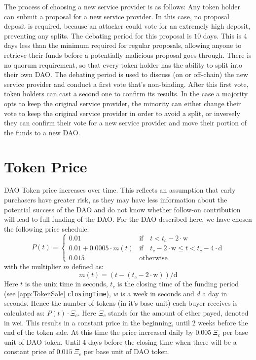 \documentclass[9pt,oneside]{amsart}
\begin{document}
\begin{multicols}{2}
The process of choosing a new service provider is as follows:
Any token holder can submit a proposal for a new service provider. In this case, no proposal deposit is required, because an attacker could vote for an extremely high deposit, preventing any splits. The debating period for this proposal is $10$ days.
This is $4$ days less than the minimum required for regular proposals, allowing anyone to retrieve their funds before a potentially malicious proposal goes through. There is no quorum requirement, so that every token holder has the ability to split into their own DAO. 
The debating period is used to discuss (on or off-chain) the new service provider and conduct a first vote that's non-binding. After this first vote, token holders can cast a second one to confirm its results. In the case a majority opts to  keep the original service provider, the minority can either change their vote to keep the original service provider in order to avoid a split, or inversely they can confirm their vote for a new service provider and move their portion of the funds to a new DAO.

\section{Token Price} \label{TokenPrice}
DAO Token price increases over time.  This reflects an assumption that early purchasers have greater risk, as they may have less information about the potential success of the DAO and do not know whether follow-on contribution will lead to full funding of the DAO.  
For the DAO described here, we have chosen the following price schedule:
\begin{equation}
 P(t) = \begin{cases}
0.01 & \text{if} \quad t < t_c - 2 \cdot \text{w} \\
0.01 + 0.0005 \cdot m(t) & \text{if} \quad t_c - 2 \cdot \text{w} \leqslant t < t_c - 4 \cdot \text{d} \\
0.015 & \text{otherwise}
\end{cases}
\end{equation}
with the multiplier $m$ defined as:
\begin{equation}
 m(t) = (t - (t_c - 2 \cdot \text{w})) / \text{d}
\end{equation}
Here $t$ is the unix time in seconds, $t_c$ is the closing time of the funding period (see \ref{app:TokenSale} \verb|closingTime|), $w$ is a week in seconds and $d$ a day in seconds.
Hence the number of tokens (in it’s base unit) each buyer receives is calculated as: $P(t) \cdot \Xi_c$. Here $\Xi_c$ stands for the amount of ether payed, denoted in wei.
This results in a constant price in the beginning, until $2$ weeks before the end of the token sale. At this time the price increased daily by $0.005 \: \Xi_c$ per base unit of DAO token. Until $4$ days before the closing time when there will be a constant price of $0.015 \: \Xi_c$ per base unit of DAO token.


\end{multicols}
\end{document}
